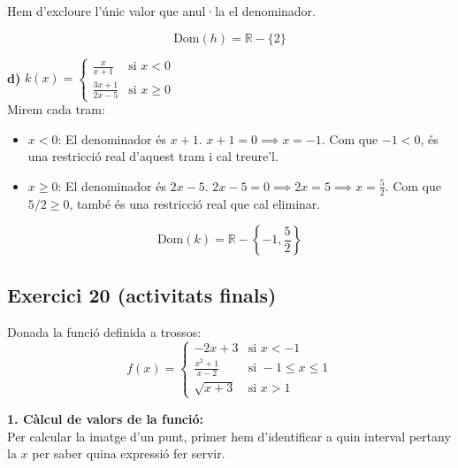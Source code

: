 \documentclass[12pt,a4paper]{article}
\begin{document}
Hem d'excloure l'únic valor que anul·la el denominador.

\[ \text{Dom}(h) = \mathbb{R} - \{2\} \]

\textbf{d)} $k(x) = \begin{cases} \frac{x}{x+1} & \text{si } x < 0 \\ \frac{3x+1}{2x-5} & \text{si } x \ge 0 \end{cases}$ \\
Mirem cada tram:
\begin{itemize}
    \item $x < 0$: El denominador és $x+1$. $x+1=0 \implies x=-1$. Com que $-1 < 0$, és una restricció real d'aquest tram i cal treure'l.
    \item $x \ge 0$: El denominador és $2x-5$. $2x-5=0 \implies 2x=5 \implies x=\frac{5}{2}$. Com que $5/2 \ge 0$, també és una restricció real que cal eliminar.
\end{itemize}
\[ \text{Dom}(k) = \mathbb{R} - \left\{-1, \frac{5}{2}\right\} \]

\subsection{Exercici 20 (activitats finals)}

Donada la funció definida a trossos:
\[ f(x) = \begin{cases} -2x+3 & \text{si } x < -1 \\ \frac{x^2+1}{x-2} & \text{si } -1 \le x \le 1 \\ \sqrt{x+3} & \text{si } x > 1 \end{cases} \]

\textbf{1. Càlcul de valors de la funció:} \\
Per calcular la imatge d'un punt, primer hem d'identificar a quin interval pertany la $x$ per saber quina expressió fer servir.
\end{document}
